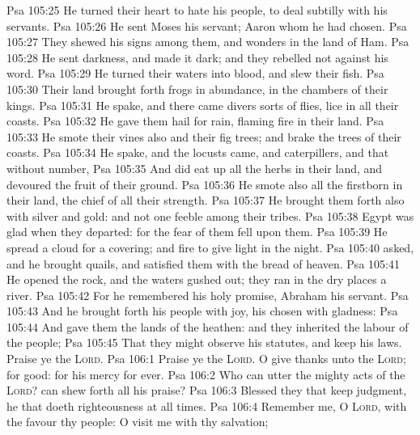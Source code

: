 \vs Psa 105:25 He turned their heart to hate his people, to deal subtilly with his servants.
\vs Psa 105:26 He sent Moses his servant;  Aaron whom he had chosen.
\vs Psa 105:27 They shewed his signs among them, and wonders in the land of Ham.
\vs Psa 105:28 He sent darkness, and made it dark; and they rebelled not against his word.
\vs Psa 105:29 He turned their waters into blood, and slew their fish.
\vs Psa 105:30 Their land brought forth frogs in abundance, in the chambers of their kings.
\vs Psa 105:31 He spake, and there came divers sorts of flies,  lice in all their coasts.
\vs Psa 105:32 He gave them hail for rain,  flaming fire in their land.
\vs Psa 105:33 He smote their vines also and their fig trees; and brake the trees of their coasts.
\vs Psa 105:34 He spake, and the locusts came, and caterpillers, and that without number,
\vs Psa 105:35 And did eat up all the herbs in their land, and devoured the fruit of their ground.
\vs Psa 105:36 He smote also all the firstborn in their land, the chief of all their strength.
\vs Psa 105:37 He brought them forth also with silver and gold: and  not one feeble  among their tribes.
\vs Psa 105:38 Egypt was glad when they departed: for the fear of them fell upon them.
\vs Psa 105:39 He spread a cloud for a covering; and fire to give light in the night.
\vs Psa 105:40  asked, and he brought quails, and satisfied them with the bread of heaven.
\vs Psa 105:41 He opened the rock, and the waters gushed out; they ran in the dry places  a river.
\vs Psa 105:42 For he remembered his holy promise,  Abraham his servant.
\vs Psa 105:43 And he brought forth his people with joy,  his chosen with gladness:
\vs Psa 105:44 And gave them the lands of the heathen: and they inherited the labour of the people;
\vs Psa 105:45 That they might observe his statutes, and keep his laws. Praise ye the \textsc{Lord}.
\vs Psa 106:1 Praise ye the \textsc{Lord}. O give thanks unto the \textsc{Lord}; for  good: for his mercy  for ever.
\vs Psa 106:2 Who can utter the mighty acts of the \textsc{Lord}?  can shew forth all his praise?
\vs Psa 106:3 Blessed  they that keep judgment,  he that doeth righteousness at all times.
\vs Psa 106:4 Remember me, O \textsc{Lord}, with the favour  thy people: O visit me with thy salvation;
